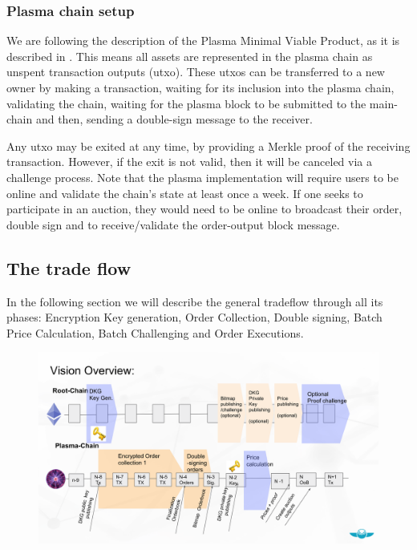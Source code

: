 \documentclass[11pt,parskip=full]{scrartcl}%
\begin{document}
\subsubsection{Plasma chain setup}
We are following the description of the Plasma Minimal Viable Product, as it is described in \cite{MVP}. 
This means all assets are represented in the plasma chain as unspent transaction outputs (utxo). 
These utxos can be transferred to a new owner by making a transaction, waiting for its inclusion into the plasma chain, validating the chain, waiting for the plasma block to be submitted to the main-chain and then, sending a double-sign message to the receiver. 

Any utxo may be exited at any time, by providing a Merkle proof of the receiving transaction. 
However, if the exit is not valid, then it will be canceled via a challenge process. 
Note that the plasma implementation will require users to be online and validate the chain's state at least once a week. 
If one seeks to participate in an auction, they would need to be online to broadcast their order, double sign and to receive/validate the order-output block message. 


\subsection{The trade flow}
\label{subsec:data}

In the following section we will describe the general tradeflow through all its phases: Encryption Key generation, Order Collection, Double signing, Batch Price Calculation, Batch Challenging and Order Executions.

\begin{figure}
\centering
\includegraphics[width=\textwidth]{overview_tradeflow.png}
\end{figure}
\end{document}
